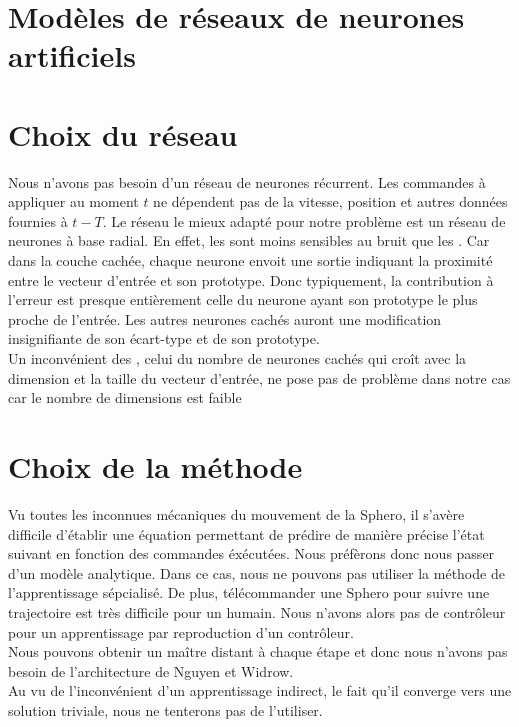 \documentclass[12pt,a4paper,oneside, titlepage]{article}
\begin{document}


\tableofcontents
\newpage


\section{Modèles de réseaux de neurones artificiels}
\terminologie










\section{Choix du réseau}
Nous n'avons pas besoin d'un réseau de neurones récurrent. Les commandes à appliquer au moment $t$ ne dépendent pas de la vitesse, position et autres données fournies à $t-T$.
Le réseau le mieux adapté pour notre problème est un réseau de neurones à base radial.
En effet, les \rbf sont moins sensibles au bruit que les \mlp \cite{adversarial,Gauthier}.%
Car dans la couche cachée, chaque neurone envoit une sortie indiquant la proximité entre le vecteur d'entrée et son prototype.
Donc typiquement, la contribution à l'erreur est presque entièrement celle du neurone ayant son prototype le plus proche de l'entrée.
Les autres neurones cachés auront une modification insignifiante de son écart-type et de son prototype.\\


Un inconvénient des \rbf, celui du nombre de neurones cachés qui croît avec la dimension et la taille du vecteur d'entrée, ne pose pas de problème dans notre cas car le nombre de dimensions est faible



\section{Choix de la méthode}
Vu toutes les inconnues mécaniques du mouvement de la Sphero, il s'avère difficile d'établir une équation permettant de prédire de manière précise l'état suivant en fonction des commandes éxécutées.
Nous préfèrons donc nous passer d'un modèle analytique.
Dans ce cas, nous ne pouvons pas utiliser la méthode de l'apprentissage sépcialisé.
De plus, télécommander une Sphero pour suivre une trajectoire est très difficile pour un humain.
Nous n'avons alors pas de contrôleur pour un apprentissage par reproduction d'un contrôleur.\\
Nous pouvons obtenir un maître distant à chaque étape et donc nous n'avons pas besoin de l'architecture de Nguyen et Widrow.\\
Au vu de l'inconvénient d'un apprentissage indirect, le fait qu'il converge vers une solution triviale, nous ne tenterons pas de l'utiliser.\\
\end{document}
